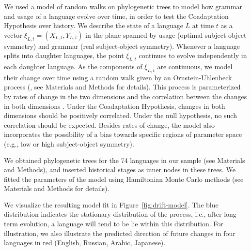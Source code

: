 \documentclass[11pt,a4paper]{article}
\begin{document}
We used a model of random walks on phylogenetic trees \citep{felsenstein1973maximum,pagel1997inferring, pagel2004bayesian} to model how grammar and usage of a language evolve over time, in order to test the Coadaptation Hypothesis over history.
We describe the state of a language $L$ at time $t$ as a vector $\xi_{L,t} = (X_{L,t}, Y_{L,t})$ in the plane spanned by usage (optimal subject-object symmetry) and grammar (real subject-object symmetry).
Whenever a language splits into daughter languages, the point $\xi_{L,t}$ continues to evolve independently in each daughter language.
As the components of $\xi_{L,t}$ are continuous, we model their change over time using a random walk given by an Ornstein-Uhlenbeck process (\citep{blackwell2003bayesian}, see Materials and Methods for details).
This process is parameterized by rates of change in the two dimensions and the correlation between the changes in both dimensions \citep{felsenstein1973maximum,freckleton2012fast}.
Under the Coadaptation Hypothesis, changes in both dimensions should be positively correlated.
Under the null hypothesis, no such correlation should be expected.
Besides rates of change, the model also incorporates the possibility of a bias towards specific regions of parameter space (e.g., low or high subject-object symmetry).

We obtained phylogenetic trees for the 74 languages in our sample (see Materials and Methods), and inserted historical stages as inner nodes in these trees.
We fitted the parameters of the model using Hamiltonian Monte Carlo methods (see Materials and Methods for details).







We visualize the resulting model fit in Figure~\ref{fig:drift-model}.
The blue distribution indicates the stationary distribution of the process, i.e., after long-term evolution, a language will tend to be lie within this distribution.
For illustration, we also illustrate the predicted direction of future changes in four languages in red (English, Russian, Arabic, Japanese).
\end{document}
